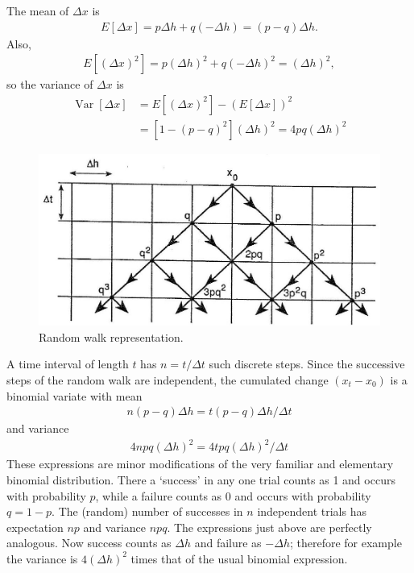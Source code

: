 \documentclass[12pt]{article}
\theoremstyle{definition}
\begin{document}
The mean of $\Delta x$ is
\begin{align}
    E[\Delta x]=p \Delta h+q(-\Delta h)=(p-q) \Delta h. \label{1.2}
\end{align}
Also,
\begin{align*}
    E\left[(\Delta x)^{2}\right]=p(\Delta h)^{2}+q(-\Delta h)^{2}=(\Delta h)^{2},
\end{align*}
so the variance of $\Delta x$ is
\begin{align}
    \operatorname{Var}[\Delta x] & =E\left[(\Delta x)^{2}\right]-(E[\Delta x])^{2} \\
    & =\left[1-(p-q)^{2}\right](\Delta h)^{2}=4 p q(\Delta h)^{2} \label{1.3}
\end{align}

\begin{figure}
    \centering
    \includegraphics[max width=\textwidth]{2024_03_12_f639bb6397b3ab65b08bg-02}
    \caption{Random walk representation.}\label{fig: 1.1}
\end{figure}
A time interval of length $t$ has $n=t / \Delta t$ such discrete steps. Since the successive steps of the random walk are independent, the cumulated change $\left(x_{t}-x_{0}\right)$ is a binomial variate with mean
\begin{align*}
n(p-q) \Delta h=t(p-q) \Delta h / \Delta t
\end{align*}
and variance
\begin{align*}
4 n p q(\Delta h)^{2}=4 t p q(\Delta h)^{2} / \Delta t
\end{align*}
These expressions are minor modifications of the very familiar and elementary binomial distribution. There a `success' in any one trial counts as 1 and occurs with probability $p$, while a failure counts as 0 and occurs with probability $q=1-p$. The (random) number of successes in $n$ independent trials has expectation $n p$ and variance $n p q$. The expressions just above are perfectly analogous. Now success counts as $\Delta h$ and failure as $-\Delta h$; therefore for example the variance is $4(\Delta h)^{2}$ times that of the usual binomial expression.
\end{document}
